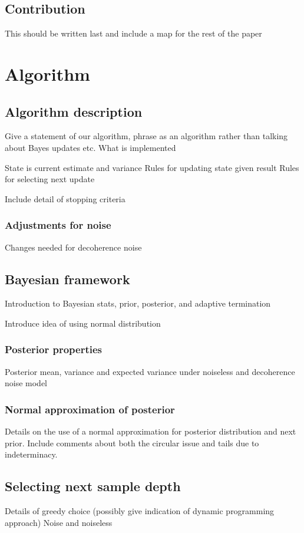 \documentclass[a4paper,onecolumn,11pt,unpublished]{quantumarticle}
\begin{document}
\subsection{Contribution}
This should be written last and include a map for the rest of the paper


\section{Algorithm}

\subsection{Algorithm description}
Give a statement of our algorithm, phrase as an algorithm rather than talking about Bayes updates etc. What is implemented

State is current estimate and variance
Rules for updating state given result
Rules for selecting next update

Include detail of stopping criteria

\subsubsection{Adjustments for noise}
Changes needed for decoherence noise

\subsection{Bayesian framework}
Introduction to Bayesian stats, prior, posterior, and adaptive termination

Introduce idea of using normal distribution


\subsubsection{Posterior properties}
Posterior mean, variance and expected variance under noiseless and decoherence noise model

\subsubsection{Normal approximation of posterior}
Details on the use of a normal approximation for posterior distribution and next prior.
Include comments about both the circular issue and tails due to indeterminacy.

\subsection{Selecting next sample depth}
Details of greedy choice (possibly give indication of dynamic programming approach)
Noise and noiseless
\end{document}

